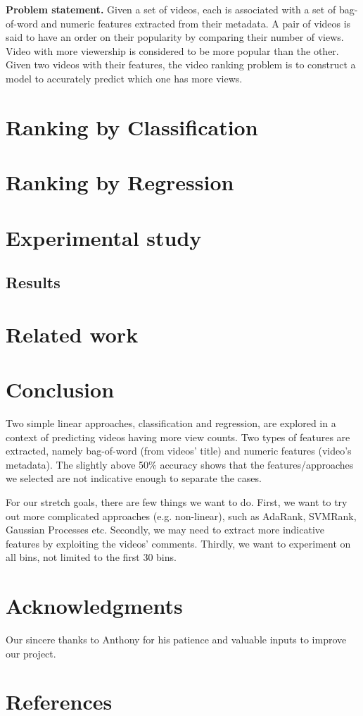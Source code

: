 \documentclass{article} %
\begin{document}
	\textbf{Problem statement.} Given a set of videos, each is associated with a set of bag-of-word and numeric features extracted from their metadata. A pair of videos is said to have an order on their popularity by comparing their number of views. Video with more viewership is considered to be more popular than the other. Given two videos with their features, the video ranking problem is to construct a model to accurately predict which one has more views.

\section{Ranking by Classification}
\label{sec:ranking}
	
\section{Ranking by Regression}
\label{sec:regression}
	
\section{Experimental study}
\label{sec:experiment}
	
\subsection{Results}
\label{sec:results}
	
\section{Related work}
\label{sec:related}
	
\section{Conclusion}
Two simple linear approaches, classification and regression, are explored in a context of predicting videos having more view counts. Two types of features are extracted, namely bag-of-word (from videos' title) and numeric features (video's metadata). The slightly above 50\% accuracy shows that the features/approaches we selected are not indicative enough to separate the cases. 

For our stretch goals, there are few things we want to do. First, we want to try out more complicated approaches (e.g. non-linear), such as AdaRank, SVMRank, Gaussian Processes etc. Secondly, we may need to extract more indicative features by exploiting the videos' comments. Thirdly, we want to experiment on all bins, not limited to the first 30 bins.

\section*{Acknowledgments}
	Our sincere thanks to Anthony for his patience and valuable inputs to improve our project.

\section*{References}
\label{sec:references}
	
\end{document}
